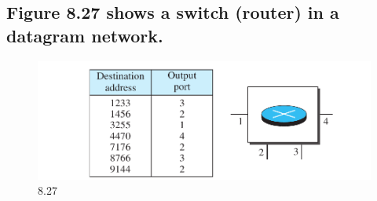 \documentclass{article}
\begin{document}
\subsection{Figure 8.27 shows a switch (router) in a datagram network.}

\begin{figure}[H]
    \center
    \includegraphics[scale=0.5]{8.27.png}
    \caption{8.27}
\end{figure}








\end{document}
